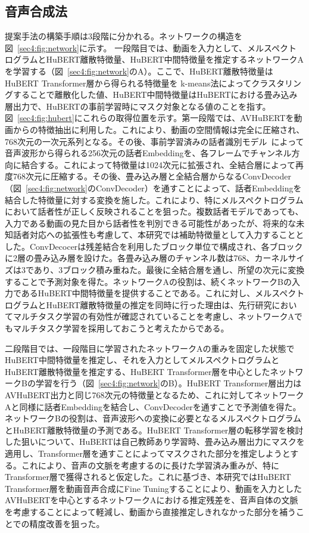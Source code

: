\documentclass[12pt]{jarticle}
\numberwithin{equation}{section}    %
\numberwithin{figure}{section}      %
\numberwithin{table}{section}      %
\begin{document}
\subsection{音声合成法}
提案手法の構築手順は3段階に分かれる。ネットワークの構造を図~\ref{sec4:fig:network}に示す。
一段階目では、動画を入力として、メルスペクトログラムとHuBERT離散特徴量、HuBERT中間特徴量を推定するネットワークAを学習する（図~\ref{sec4:fig:network}のA）。ここで、HuBERT離散特徴量はHuBERT Transformer層から得られる特徴量を k-means法によってクラスタリングすることで離散化した値、HuBERT中間特徴量はHuBERTにおける畳み込み層出力で、HuBERTの事前学習時にマスク対象となる値のことを指す。図~\ref{sec4:fig:hubert}にこれらの取得位置を示す。第一段階では、AVHuBERTを動画からの特徴抽出に利用した。これにより、動画の空間情報は完全に圧縮され、768次元の一次元系列となる。その後、事前学習済みの話者識別モデル~\cite{wan2018generalized}によって音声波形から得られる256次元の話者Embeddingを、各フレームでチャンネル方向に結合する。これによって特徴量は1024次元に拡張され、全結合層によって再度768次元に圧縮する。その後、畳み込み層と全結合層からなるConvDecoder（図~\ref{sec4:fig:network}のConvDecoder）を通すことによって、話者Embeddingを結合した特徴量に対する変換を施した。これにより、特にメルスペクトログラムにおいて話者性が正しく反映されることを狙った。複数話者モデルであっても、入力である動画の見た目から話者性を判別できる可能性があったが、将来的な未知話者対応への拡張性も考慮して、本研究では補助特徴量として入力することとした。ConvDecocerは残差結合を利用したブロック単位で構成され、各ブロックに2層の畳み込み層を設けた。各畳み込み層のチャンネル数は768、カーネルサイズは3であり、3ブロック積み重ねた。最後に全結合層を通し、所望の次元に変換することで予測対象を得た。ネットワークAの役割は、続くネットワークBの入力であるHuBERT中間特徴量を提供することである。これに対し、メルスペクトログラムとHuBERT離散特徴量の推定を同時に行った理由は、先行研究においてマルチタスク学習の有効性が確認されていることを考慮し、ネットワークAでもマルチタスク学習を採用しておこうと考えたからである。

二段階目では、一段階目に学習されたネットワークAの重みを固定した状態でHuBERT中間特徴量を推定し、それを入力としてメルスペクトログラムとHuBERT離散特徴量を推定する、HuBERT Transformer層を中心としたネットワークBの学習を行う（図~\ref{sec4:fig:network}のB）。HuBERT Transformer層出力はAVHuBERT出力と同じ768次元の特徴量となるため、これに対してネットワークAと同様に話者Embeddingを結合し、ConvDecoderを通すことで予測値を得た。ネットワークBの役割は、音声波形への変換に必要となるメルスペクトログラムとHuBERT離散特徴量の予測である。HuBERT Transformer層の転移学習を検討した狙いについて、HuBERTは自己教師あり学習時、畳み込み層出力にマスクを適用し、Transformer層を通すことによってマスクされた部分を推定しようとする。これにより、音声の文脈を考慮するのに長けた学習済み重みが、特にTransformer層で獲得されると仮定した。これに基づき、本研究ではHuBERT Transformer層を動画音声合成にFine Tuningすることにより、動画を入力としたAVHuBERTを中心とするネットワークAにおける推定残差を、音声自体の文脈を考慮することによって軽減し、動画から直接推定しきれなかった部分を補うことでの精度改善を狙った。
\end{document}
